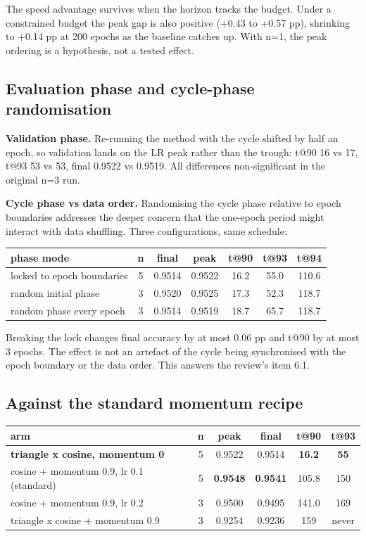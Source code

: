 \documentclass[11pt,a4paper]{article}
\begin{document}
The speed advantage survives when the horizon tracks the budget. Under a constrained budget the peak gap is also positive (+0.43 to +0.57 pp), shrinking to +0.14 pp at 200 epochs as the baseline catches up. With n=1, the peak ordering is a hypothesis, not a tested effect.

\subsection{Evaluation phase and cycle-phase randomisation}
\textbf{Validation phase.} Re-running the method with the cycle shifted by half an epoch, so validation lands on the LR peak rather than the trough: t@90 16 vs 17, t@93 53 vs 53, final 0.9522 vs 0.9519. All differences non-significant in the original n=3 run.

\textbf{Cycle phase vs data order.} Randomising the cycle phase relative to epoch boundaries addresses the deeper concern that the one-epoch period might interact with data shuffling. Three configurations, same schedule:

\begin{center}
\small
\begin{tabular}{@{}lcccccc@{}}
\toprule
\textbf{phase mode} & \textbf{n} & \textbf{final} & \textbf{peak} & \textbf{t@90} & \textbf{t@93} & \textbf{t@94} \\
\midrule
locked to epoch boundaries & 5 & 0.9514 & 0.9522 & 16.2 & 55.0 & 110.6 \\
random initial phase & 3 & 0.9520 & 0.9525 & 17.3 & 52.3 & 118.7 \\
random phase every epoch & 3 & 0.9514 & 0.9519 & 18.7 & 65.7 & 118.7 \\
\bottomrule
\end{tabular}
\end{center}

Breaking the lock changes final accuracy by at most 0.06 pp and t@90 by at most 3 epochs. The effect is not an artefact of the cycle being synchronised with the epoch boundary or the data order. This answers the review's item 6.1.

\subsection{Against the standard momentum recipe}
\begin{center}
\small
\begin{tabular}{@{}lccccc@{}}
\toprule
\textbf{arm} & \textbf{n} & \textbf{peak} & \textbf{final} & \textbf{t@90} & \textbf{t@93} \\
\midrule
\textbf{triangle x cosine, momentum 0} & 5 & 0.9522 & 0.9514 & \textbf{16.2} & \textbf{55} \\
cosine + momentum 0.9, lr 0.1 (standard) & 5 & \textbf{0.9548} & \textbf{0.9541} & 105.8 & 150 \\
cosine + momentum 0.9, lr 0.2 & 3 & 0.9500 & 0.9495 & 141.0 & 169 \\
triangle x cosine + momentum 0.9 & 3 & 0.9254 & 0.9236 & 159 & never \\
\bottomrule
\end{tabular}
\end{center}
\end{document}
